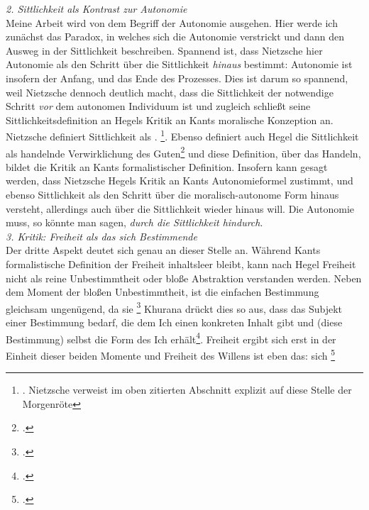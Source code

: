 \documentclass[12pt, a4paper, openany]{report}
\begin{document}
\emph{2. Sittlichkeit als Kontrast zur Autonomie}\\
Meine Arbeit wird von dem Begriff der Autonomie ausgehen. 
Hier werde ich zunächst das Paradox, in welches sich die Autonomie verstrickt und dann den Ausweg in der Sittlichkeit beschreiben.
Spannend ist, dass Nietzsche hier Autonomie als den Schritt über die Sittlichkeit \emph{hinaus} bestimmt:
Autonomie ist insofern der Anfang, und das Ende des Prozesses.
Dies ist darum so spannend, weil Nietzsche dennoch deutlich macht, dass die Sittlichkeit der notwendige Schritt \emph{vor} dem autonomen Individuum ist und zugleich schließt seine Sittlichkeitsdefinition an Hegels Kritik an Kants moralische Konzeption an.
Nietzsche definiert Sittlichkeit als .%
\footnote{
    . 
    Nietzsche verweist im oben zitierten Abschnitt explizit auf diese Stelle der Morgenröte
    }.
Ebenso definiert auch Hegel die Sittlichkeit als handelnde Verwirklichung des Guten\footcite[Vgl.][§142, S. 161]{hegel_grundlinien_2017} und diese Definition, über das Handeln, bildet die Kritik an Kants formalistischer Definition.
Insofern kann gesagt werden, dass Nietzsche Hegels Kritik an Kants Autonomieformel zustimmt, und ebenso Sittlichkeit als den Schritt über die moralisch-autonome Form hinaus versteht, allerdings auch über die Sittlichkeit wieder hinaus will.
Die Autonomie muss, so könnte man sagen, \emph{durch die Sittlichkeit hindurch}.\\

\emph{3. Kritik: Freiheit als das sich Bestimmende}\\
Der dritte Aspekt deutet sich genau an dieser Stelle an. 
Während Kants formalistische Definition der Freiheit inhaltsleer bleibt, kann nach Hegel Freiheit nicht als reine Unbestimmtheit oder bloße Abstraktion verstanden werden.
Neben dem Moment der bloßen Unbestimmtheit, ist die einfachen Bestimmung gleichsam ungenügend, da sie \footcite[][39]{hegel_grundlinien_2017}
Khurana drückt dies so aus, dass das Subjekt einer Bestimmung bedarf, die dem Ich einen konkreten Inhalt gibt und (diese Bestimmung) selbst die Form des Ich erhält\footcite[Vgl.][285]{khurana_freiheit_2017}. 
Freiheit ergibt sich erst in der Einheit dieser beiden Momente und Freiheit des Willens ist eben das: sich \footcite[][40, §7]{hegel_grundlinien_2017}\\
\end{document}

